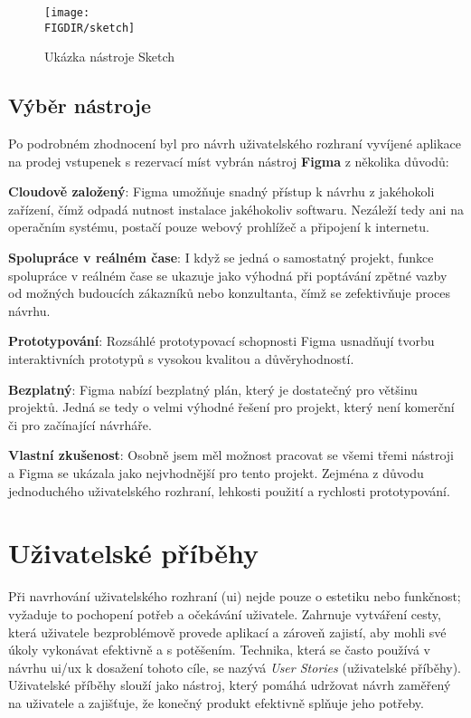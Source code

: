 \begin{figure}[H]
    \centering
    \texttt{[image: \\FIGDIR/sketch]}
    \caption{Ukázka nástroje Sketch\cite{sketch}}
    \label{fig:sketch}
\end{figure}

\subsection{Výběr nástroje}
\label{subsec:navrh-ui-nastroje-vyber}
Po podrobném zhodnocení byl pro návrh uživatelského rozhraní vyvíjené aplikace na prodej vstupenek s rezervací míst vybrán nástroj \textbf{Figma} z několika důvodů:

\textbf{Cloudově založený}: Figma umožňuje snadný přístup k návrhu z jakéhokoli zařízení, čímž odpadá nutnost instalace jakéhokoliv softwaru.
Nezáleží tedy ani na operačním systému, postačí pouze webový prohlížeč a připojení k internetu.

\textbf{Spolupráce v reálném čase}: I když se jedná o samostatný projekt, funkce spolupráce v reálném čase se ukazuje jako výhodná při poptávání zpětné vazby od možných budoucích zákazníků nebo konzultanta, čímž se zefektivňuje proces návrhu.

\textbf{Prototypování}: Rozsáhlé prototypovací schopnosti Figma usnadňují tvorbu interaktivních prototypů s vysokou kvalitou a důvěryhodností.

\textbf{Bezplatný}: Figma nabízí bezplatný plán, který je dostatečný pro většinu projektů.
Jedná se tedy o velmi výhodné řešení pro projekt, který není komerční či pro začínající návrháře.

\textbf{Vlastní zkušenost}: Osobně jsem měl možnost pracovat se všemi třemi nástroji a Figma se ukázala jako nejvhodnější pro tento projekt.
Zejména z důvodu jednoduchého uživatelského rozhraní, lehkosti použití a rychlosti prototypování.

\section{Uživatelské příběhy}
\label{sec:navrh-ui-uzivatelske-pribehy}
Při navrhování uživatelského rozhraní (\ac{ui}) nejde pouze o estetiku nebo funkčnost; vyžaduje to pochopení potřeb a očekávání uživatele.
Zahrnuje vytváření cesty, která uživatele bezproblémově provede aplikací a zároveň zajistí, aby mohli své úkoly vykonávat efektivně a s potěšením.
Technika, která se často používá v návrhu \ac{ui}/\ac{ux} k dosažení tohoto cíle, se nazývá \textit{User Stories} (uživatelské příběhy).
Uživatelské příběhy slouží jako nástroj, který pomáhá udržovat návrh zaměřený na uživatele a zajišťuje, že konečný produkt efektivně splňuje jeho potřeby.

